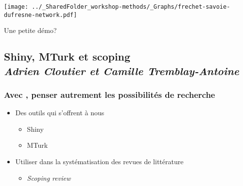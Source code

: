 \documentclass{beamer}
\begin{document}

 \begin{frame}
 
 
       \begin{center}
 
            \texttt{[image: ../\_SharedFolder\_workshop-methods/\_Graphs/frechet-savoie-dufresne-network.pdf]}
    
       \end{center}
 
 
 \end{frame}
 
 
 \begin{frame}
     \begin{center}
          \Huge Une petite démo?

      \end{center}
\end{frame}


 


\subsection{Shiny, MTurk et scoping \\ \small\emph{Adrien Cloutier et Camille Tremblay-Antoine}}


    \begin{frame}
    
        \frametitle{Avec \R, penser autrement les possibilités de recherche} \vspace{1cm}
    
    \end{frame}



    \begin{frame}
    
        \begin{itemize}
        
        \item{Des outils qui s'offrent à nous}
         
          \begin{itemize}
            \item{Shiny}
	    \item{MTurk}
          \end{itemize}
	  
	  
         \item{Utiliser \R dans la systématisation des revues de littérature}
        
          \begin{itemize}
            \item{\emph{Scoping review}}
          \end{itemize}         
        \end{itemize}
        
    \end{frame}
\end{document}
